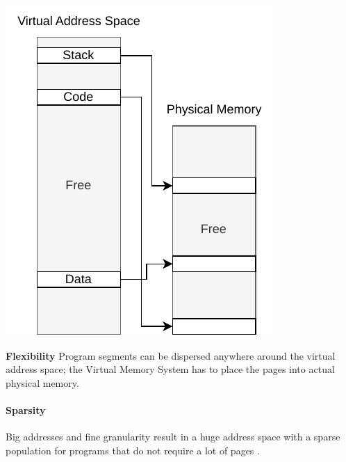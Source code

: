 \begin{marginfigure}
    \includegraphics*[width=0.9\marginparwidth]{figures/fund_flexibility.pdf}
    \caption{\textbf{Flexibility} Program segments can be dispersed anywhere
        around the virtual address space; the Virtual Memory System has to place
        the pages into actual physical memory.}
\end{marginfigure}

\paragraph{Sparsity} Big addresses and fine granularity result in a huge address
space with a sparse population for programs that do not require a lot of pages
\cite{tanenbaumOS}.

